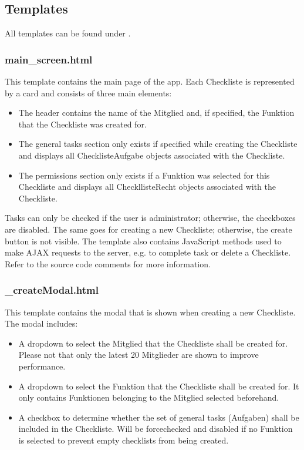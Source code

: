 \documentclass[letterpaper,10pt,english]{sphinxmanual}
\begin{document}
\subsection{Templates}
\label{\detokenize{masterCodeDoc:id11}}
All templates can be found under .


\subsubsection{main\_screen.html}
\label{\detokenize{masterCodeDoc:id12}}
This template contains the main page of the app. Each Checkliste is represented by a card and consists of three main elements:
\begin{itemize}
\item {} 
The header contains the name of the Mitglied and, if specified, the Funktion that the Checkliste was created for.

\item {} 
The general tasks section only exists if specified while creating the Checkliste and displays all ChecklisteAufgabe objects associated with the Checkliste.

\item {} 
The permissions section only exists if a Funktion was selected for this Checkliste and displays all CheckllisteRecht objects associated with the Checkliste.

\end{itemize}

Tasks can only be checked if the user is administrator; otherwise, the checkboxes are disabled. The same goes for creating a new Checkliste; otherwise, the create button is not visible.
The template also contains JavaScript methods used to make AJAX requests to the server, e.g. to complete task or delete a Checkliste. Refer to the source code comments for more information.


\subsubsection{\_createModal.html}
\label{\detokenize{masterCodeDoc:createmodal-html}}
This template contains the modal that is shown when creating a new Checkliste. The modal includes:
\begin{itemize}
\item {} 
A dropdown to select the Mitglied that the Checkliste shall be created for. Please not that only the latest 20 Mitglieder are shown to improve performance.

\item {} 
A dropdown to select the Funktion that the Checkliste shall be created for. It only contains Funktionen belonging to the Mitglied selected beforehand.

\item {} 
A checkbox to determine whether the set of general tasks (Aufgaben) shall be included in the Checkliste. Will be force\sphinxhyphen{}checked and disabled if no Funktion is selected to prevent empty checklists from being created.

\end{itemize}
\end{document}
